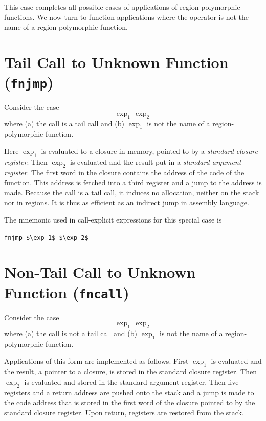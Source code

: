 \documentclass[12pt]{book}
\begin{document}
This case completes all possible cases of applications of region-polymorphic
functions. We now turn to function applications where the operator is not the
name of a region-polymorphic function.

\section{Tail Call to Unknown Function (\texttt{fnjmp})}

Consider the case
%
%
%
$$\exp_1\,\exp_2$$ where (a) the call is a tail call and (b) $\exp_1$ is not the
name of a region-polymorphic function.

Here $\exp_1$ is evaluated to a closure in memory, pointed to by a
%
%
%
%
{\em standard closure register}. Then $\exp_2$ is evaluated and the result put
in a
%
%
%
%
{\em standard argument register}. The first word in the closure contains the
address of the code of the function. This address is fetched into a third
register and a jump to the address is made.  Because the call is a tail call, it
induces no allocation, neither on the stack nor in regions.  It is thus as
efficient as an indirect jump in assembly language.


The mnemonic used in call-explicit expressions for this special case is
\begin{center}
  \lstinline!fnjmp $\exp_1$ $\exp_2$!
\end{center}

\section{Non-Tail Call to Unknown Function (\texttt{fncall})}

Consider the case
$$\exp_1\,\exp_2$$ where (a) the call is not a tail call and (b) $\exp_1$ is not
the name of a region-polymorphic function.

Applications of this form are implemented as follows. First $\exp_1$ is
evaluated and the result, a pointer to a closure, is stored in the
%
%
%
%
standard closure register. Then $\exp_2$ is evaluated and stored in the
%
%
%
%
standard argument register.  Then live registers and a return address are pushed
onto the stack and a jump is made to the code address that is stored in the
first word of the closure pointed to by the standard closure register. Upon
return, registers are restored from the stack.
\end{document}
